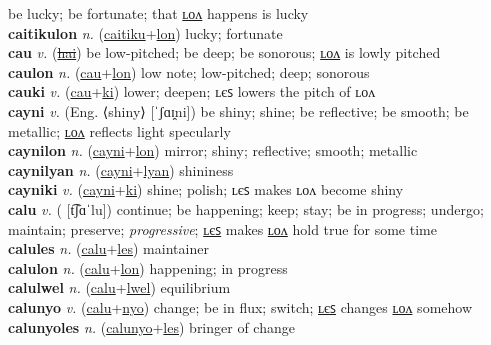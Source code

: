 be lucky; be fortunate; that \hyperref[caitikulon]{ʟᴏᴧ} happens is lucky \label{caitiku} \\
\textbf{caitikulon} \textit{n.} (\hyperref[caitiku]{caitiku}+\hyperref[lon]{lon})
lucky; fortunate \label{caitikulon} \\
\textbf{cau} \textit{v.} (\hyperref[hai]{\sout{hai}})
be low-pitched; be deep; be sonorous; \hyperref[caulon]{ʟᴏᴧ} is lowly pitched \label{cau} \\
\textbf{caulon} \textit{n.} (\hyperref[cau]{cau}+\hyperref[lon]{lon})
low note; low-pitched; deep; sonorous \label{caulon} \\
\textbf{cauki} \textit{v.} (\hyperref[cau]{cau}+\hyperref[ki]{ki})
lower; deepen; ʟєꜱ lowers the pitch of ʟᴏᴧ \label{cauki} \\
\textbf{cayni} \textit{v.} (Eng. ⟨shiny⟩ [ˈʃɑɪ̯ni])
be shiny; shine; be reflective; be smooth; be metallic; \hyperref[caynilon]{ʟᴏᴧ} reflects light specularly \label{cayni} \\
\textbf{caynilon} \textit{n.} (\hyperref[cayni]{cayni}+\hyperref[lon]{lon})
mirror; shiny; reflective; smooth; metallic \label{caynilon} \\
\textbf{caynilyan} \textit{n.} (\hyperref[cayni]{cayni}+\hyperref[lyan]{lyan})
shininess \label{caynilyan} \\
\textbf{cayniki} \textit{v.} (\hyperref[cayni]{cayni}+\hyperref[ki]{ki})
shine; polish; ʟєꜱ makes ʟᴏᴧ become shiny \label{cayniki} \\
\textbf{calu} \textit{v.} ( [t͡ʃɑˈlu])
continue; be happening; keep; stay; be in progress; undergo; maintain; preserve; \textit{progressive}; \hyperref[calules]{ʟєꜱ} makes \hyperref[calulon]{ʟᴏᴧ} hold true for some time \label{calu} \\
\textbf{calules} \textit{n.} (\hyperref[calu]{calu}+\hyperref[les]{les})
maintainer \label{calules} \\
\textbf{calulon} \textit{n.} (\hyperref[calu]{calu}+\hyperref[lon]{lon})
happening; in progress \label{calulon} \\
\textbf{calulwel} \textit{n.} (\hyperref[calu]{calu}+\hyperref[lwel]{lwel})
equilibrium \label{calulwel} \\
\textbf{calunyo} \textit{v.} (\hyperref[calu]{calu}+\hyperref[nyo]{nyo})
change; be in flux; switch; \hyperref[calunyoles]{ʟєꜱ} changes \hyperref[calunyolon]{ʟᴏᴧ} somehow \label{calunyo} \\
\textbf{calunyoles} \textit{n.} (\hyperref[calunyo]{calunyo}+\hyperref[les]{les})
bringer of change \label{calunyoles} \\
